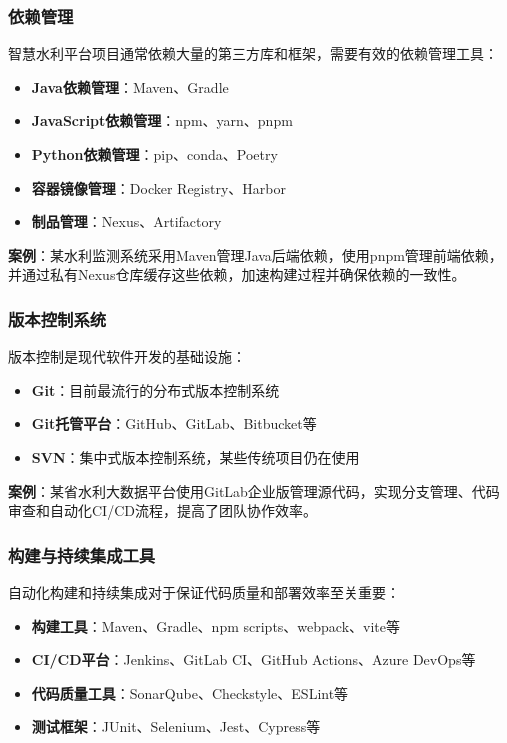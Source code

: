 \subsubsection{依赖管理}\label{ux4f9dux8d56ux7ba1ux7406}

智慧水利平台项目通常依赖大量的第三方库和框架，需要有效的依赖管理工具：

\begin{itemize}
\tightlist
\item
  \textbf{Java依赖管理}：Maven、Gradle
\item
  \textbf{JavaScript依赖管理}：npm、yarn、pnpm
\item
  \textbf{Python依赖管理}：pip、conda、Poetry
\item
  \textbf{容器镜像管理}：Docker Registry、Harbor
\item
  \textbf{制品管理}：Nexus、Artifactory
\end{itemize}

\textbf{案例}：某水利监测系统采用Maven管理Java后端依赖，使用pnpm管理前端依赖，并通过私有Nexus仓库缓存这些依赖，加速构建过程并确保依赖的一致性。

\subsubsection{版本控制系统}\label{ux7248ux672cux63a7ux5236ux7cfbux7edf}

版本控制是现代软件开发的基础设施：

\begin{itemize}
\tightlist
\item
  \textbf{Git}：目前最流行的分布式版本控制系统
\item
  \textbf{Git托管平台}：GitHub、GitLab、Bitbucket等
\item
  \textbf{SVN}：集中式版本控制系统，某些传统项目仍在使用
\end{itemize}

\textbf{案例}：某省水利大数据平台使用GitLab企业版管理源代码，实现分支管理、代码审查和自动化CI/CD流程，提高了团队协作效率。

\subsubsection{构建与持续集成工具}\label{ux6784ux5efaux4e0eux6301ux7eedux96c6ux6210ux5de5ux5177}

自动化构建和持续集成对于保证代码质量和部署效率至关重要：

\begin{itemize}
\tightlist
\item
  \textbf{构建工具}：Maven、Gradle、npm scripts、webpack、vite等
\item
  \textbf{CI/CD平台}：Jenkins、GitLab CI、GitHub Actions、Azure DevOps等
\item
  \textbf{代码质量工具}：SonarQube、Checkstyle、ESLint等
\item
  \textbf{测试框架}：JUnit、Selenium、Jest、Cypress等
\end{itemize}

